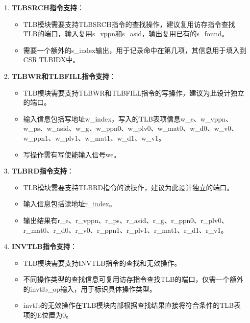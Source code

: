 \begin{enumerate}
  \begin{itemize}
  \tightlist
  \item
    为了使流水线能够满负荷运转不断流，TLB模块要能够支持取指和访存同时进行查找。这意味着查找端口应该有两套。
  \end{itemize}
\item
  \textbf{TLBSRCH指令支持}：

  \begin{itemize}
  \tightlist
  \item
    TLB模块需要支持TLBSRCH指令的查找操作，建议复用访存指令查找TLB的端口，输入复用s\_vppn和s\_asid，输出复用已有的s\_found。
  \item
    需要一个额外的s\_index输出，用于记录命中在第几项，其信息用于填入到CSR.TLBIDX中。
  \end{itemize}
\item
  \textbf{TLBWR和TLBFILL指令支持}：

  \begin{itemize}
  \tightlist
  \item
    TLB模块需要支持TLBWR和TLBFILL指令的写操作，建议为此设计独立的端口。
  \item
    输入信息包括写地址w\_index，写入的TLB表项信息w\_e、w\_vppn、w\_ps、w\_asid、w\_g、w\_ppn0、w\_plv0、w\_mat0、w\_d0、w\_v0、w\_ppn1、w\_plv1、w\_mat1、w\_d1、w\_v1。
  \item
    写操作需有写使能输入信号we。
  \end{itemize}
\item
  \textbf{TLBRD指令支持}：

  \begin{itemize}
  \tightlist
  \item
    TLB模块需要支持TLBRD指令的读操作，建议为此设计独立的端口。
  \item
    输入信息包括读地址r\_index。
  \item
    输出结果有r\_e、r\_vppn、r\_ps、r\_asid、r\_g、r\_ppn0、r\_plv0、r\_mat0、r\_d0、r\_v0、r\_ppn1、r\_plv1、r\_mat1、r\_d1、r\_v1。
  \end{itemize}
\item
  \textbf{INVTLB指令支持}：

  \begin{itemize}
  \tightlist
  \item
    TLB模块需要支持INVTLB指令的查找和无效操作。
  \item
    不同操作类型的查找信息可复用访存指令查找TLB的端口，仅需一个额外的invtlb\_op输入，用于标识具体操作类型。
  \item
    invtlb的无效操作在TLB模块内部根据查找结果直接将符合条件的TLB表项的E位置为0。
  \end{itemize}
\end{enumerate}

